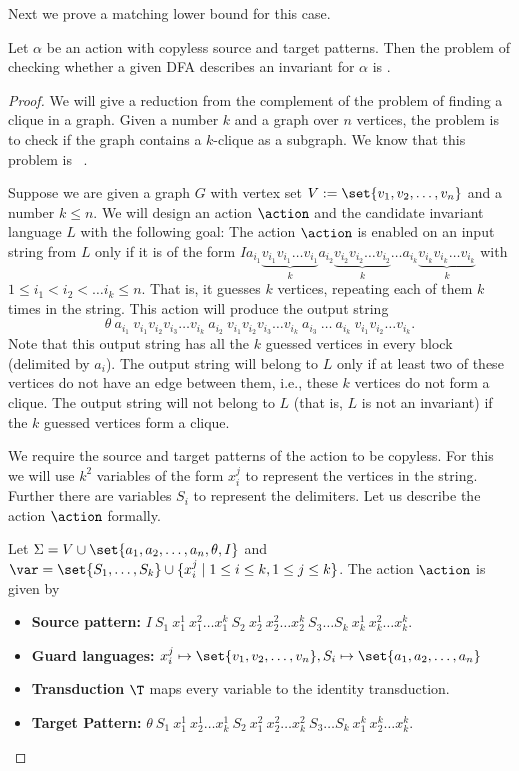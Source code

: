 Next we prove a matching lower bound for this case.
\begin{lemma}
	Let $\alpha$ be an action with copyless source and target patterns. Then the problem of checking whether a given DFA describes an
	invariant for $\alpha$ is \conph.
\end{lemma}
\begin{proof}
	We will give a reduction from the complement of the problem of finding a clique in a graph. Given a number $k$ and a graph over $n$
	vertices, the problem is to check if the graph contains a $k$-clique as a subgraph. We know that this problem is \npc\ \cite{K1972}.

Suppose we are given a graph $G$  with vertex set $V := \set{v_1, v_2, \dots, v_n}$ and  a number $k \leq 
n$. We will design an action $\action$ and the candidate invariant language $L$  with the following goal: The action $\action$  is enabled on an input string from $L$ only if it is of the form $ I a_{i_1} \underbrace{v_{i_1}v_{i_1}\dots 
v_{i_1}}_{k} a_{i_2} \underbrace{v_{i_2}v_{i_2}\dots 
v_{i_2}}_{k}\dots a_{i_k} \underbrace{v_{i_k}v_{i_k}\dots v_{i_k}}_{k}$  
with $1 \le i_1 < i_2 < \dots i_k \le n$.  That is, it guesses $k$ 
vertices, repeating each of them $k$ times in the string. This action 
will produce the output string $$\theta ~ a_{i_1} ~ v_{i_1} v_{i_2} 
v_{i_3} \dots v_{i_k} ~ a_{i_2} ~ v_{i_1}v_{i_2} v_{i_3} \dots  v_{i_k} ~ 
a_{i_3}~ \dots ~ a_{i_k} ~ v_{i_1}v_{i_2} \dots v_{i_k}. $$ Note that this 
output string has all the $k$ guessed vertices in every block 
(delimited by $a_i$). The output string will belong to $L$ only if at 
least two of these vertices do not have an edge between them, i.e., 
these $k$ vertices do not form a clique. The output string will not 
belong to $L$ (that is, $L$ is not an invariant) if the $k$ guessed 
vertices form a clique. 

We require the source and target patterns of the action to be copyless. For this we will use $k^2$ variables of the form $x_i^j$ to represent the vertices in the string. Further there are variables $S_i$ to represent the delimiters. Let us describe the action $\action$ formally.


Let $\Sigma = V \cup \set{a_1,a_2,\ldots, a_n, \theta, 
	I}$ and $\var=\set{S_1, \ldots, S_k} \cup \{x_i^j \mid  1 \le i \le k, 1 \le j 
\le k\}$. 
The  action $\action$ is given by
\begin{itemize}
	\item \textbf{Source pattern:} $I~S_1~x_1^1~x_1^2\dots x_1^{k}~ S_2~x_2^1~x_2^2\dots x_2^{k} ~S_3 \dots S_k~x_k^1~x_k^2\dots x_k^{k}$.
	\item \textbf{Guard languages:} $x_i^j \mapsto \set{v_1, v_2, \dots, v_n}, S_i \mapsto \set{a_1, a_2, \dots, a_n}$
	\item \textbf{Transduction} $\T$ maps every variable to the identity transduction.
	\item \textbf{Target Pattern:} $\theta ~ S_1 ~x_1^1 ~x_2^1 \dots  x_k^1~ 
	S_2 ~x_1^2 ~ x_2^2  \dots  x_k^2 ~S_3
	\dots
	S_k~x_1^{k}~x_2^{k}\dots x_k^k$.
\end{itemize}


\end{proof}
